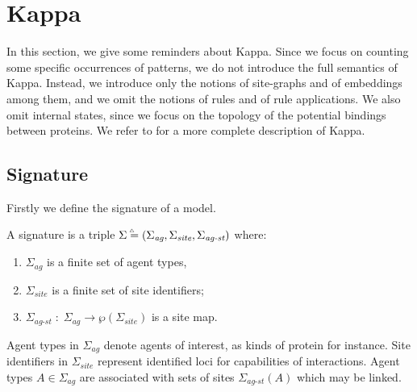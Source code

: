 \documentclass{entcs}
\newcommand{\agentname}{\signaturesymb_{\textit{ag}}}
\newcommand{\sitename}{\signaturesymb_{\textit{site}}}
\newcommand{\linksite}{\signaturesymb_{\textit{ag-st}}}
\newcommand{\signaturesymb}{\Sigma}
\newcommand{\signaturetuple}{(\agentname,\sitename,\linksite)}
\newcommand{\bydef}{\stackrel{\scalebox{0.8}{\!\!$\scriptscriptstyle{\triangle}$}}{=}}
\begin{document}
\section{Kappa}

\label{sec:kappa}

In this section, we give some reminders about Kappa.
Since we focus on counting some specific occurrences of patterns, we do not introduce the full semantics of Kappa. Instead, we introduce only the notions of site-graphs and of embeddings among them, and we omit the notions of rules and of rule applications. We also omit internal states, since we focus on the topology of the potential bindings between proteins.   We refer to \cite{DBLP:journals/tcs/DanosL04,Feret_IJSI2013} for a more complete description of Kappa.

\subsection{Signature}

Firstly we define the signature of a model.
\begin{defn}[signature]
\label{def:signature}
A signature is a triple $\signaturesymb\bydef\signaturetuple$ where: \begin{enumerate}\item $\agentname$ is a finite set of agent types, \item $\sitename$ is a finite set of site identifiers; \item $\linksite\;:\;\agentname \rightarrow \wp(\sitename)$ is a site map.
\end{enumerate}\end{defn}


Agent types in $\agentname$ denote agents of interest, as kinds of protein for instance.
Site identifiers in $\sitename$ represent identified loci for capabilities of interactions.
Agent types $A\in\agentname$ are associated with sets of sites $\linksite(A)$ which may be linked.
\end{document}
